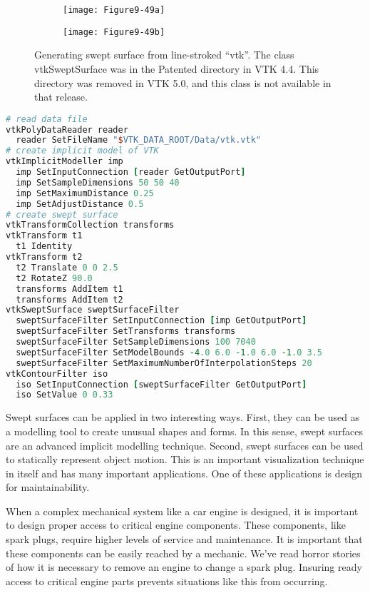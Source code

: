 \begin{figure}[htb]
    \centering
	\begin{subfigure}[h]{0.48\linewidth}
		\texttt{[image: Figure9-49a]}
		\captionsetup{justification=centering}
		\caption*{}
		\label{fig:Figure9-49a}
	\end{subfigure}
	\hfill
	\begin{subfigure}[h]{0.48\linewidth}
		\texttt{[image: Figure9-49b]}
		\captionsetup{justification=centering}
		\caption*{}
	\end{subfigure}
	\caption{Generating swept surface from line-stroked ``vtk''. The class vtkSweptSurface was in the Patented directory in VTK 4.4. This directory was removed in VTK 5.0, and this class is not available in that release.}\label{fig:Figure9-49}
\end{figure}

\begin{lstlisting}[language=TCL, caption={Generating a swept surface.}]
# read data file
vtkPolyDataReader reader
  reader SetFileName "$VTK_DATA_ROOT/Data/vtk.vtk"
# create implicit model of VTK
vtkImplicitModeller imp
  imp SetInputConnection [reader GetOutputPort]
  imp SetSampleDimensions 50 50 40
  imp SetMaximumDistance 0.25
  imp SetAdjustDistance 0.5
# create swept surface
vtkTransformCollection transforms
vtkTransform t1
  t1 Identity
vtkTransform t2
  t2 Translate 0 0 2.5
  t2 RotateZ 90.0
  transforms AddItem t1
  transforms AddItem t2
vtkSweptSurface sweptSurfaceFilter
  sweptSurfaceFilter SetInputConnection [imp GetOutputPort]
  sweptSurfaceFilter SetTransforms transforms
  sweptSurfaceFilter SetSampleDimensions 100 7040
  sweptSurfaceFilter SetModelBounds -4.0 6.0 -1.0 6.0 -1.0 3.5
  sweptSurfaceFilter SetMaximumNumberOfInterpolationSteps 20
vtkContourFilter iso
  iso SetInputConnection [sweptSurfaceFilter GetOutputPort]
  iso SetValue 0 0.33
\end{lstlisting}

Swept surfaces can be applied in two interesting ways. First, they can be used as a modelling tool to create unusual shapes and forms. In this sense, swept surfaces are an advanced implicit modelling technique. Second, swept surfaces can be used to statically represent object motion. This is an important visualization technique in itself and has many important applications. One of these applications is design for maintainability.

When a complex mechanical system like a car engine is designed, it is important to design proper access to critical engine components. These components, like spark plugs, require higher levels of service and maintenance. It is important that these components can be easily reached by a mechanic. We've read horror stories of how it is necessary to remove an engine to change a spark plug. Insuring ready access to critical engine parts prevents situations like this from occurring.

